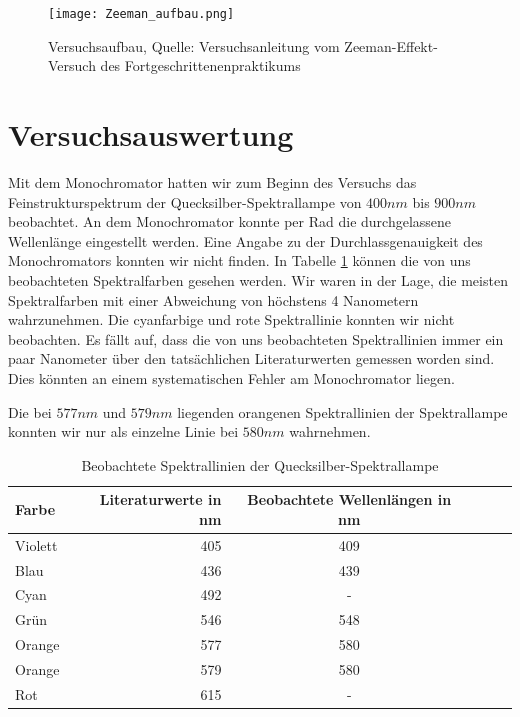 \documentclass[10pt,a4paper]{article}
\begin{document}
\begin{figure}[h]
	\texttt{[image: Zeeman\_aufbau.png]}
	\centering
	\caption{Versuchsaufbau, Quelle: Versuchsanleitung vom Zeeman-Effekt-Versuch des Fortgeschrittenenpraktikums}
	\label{aufbau}
\end{figure}

\section{Versuchsauswertung}


Mit dem Monochromator hatten wir zum Beginn des Versuchs das Feinstrukturspektrum der Quecksilber-Spektrallampe von $400nm$
bis $900nm$ beobachtet. An dem Monochromator konnte per Rad die durchgelassene Wellenlänge eingestellt werden. Eine Angabe zu der Durchlassgenauigkeit des Monochromators konnten wir nicht finden. In Tabelle \ref{spektrum} können die von uns beobachteten Spektralfarben gesehen werden. Wir waren in der Lage, die meisten Spektralfarben mit einer Abweichung von höchstens 4 Nanometern wahrzunehmen. Die cyanfarbige und rote Spektrallinie konnten wir nicht beobachten. Es fällt auf, dass die von uns beobachteten Spektrallinien immer ein paar Nanometer über den tatsächlichen Literaturwerten gemessen worden sind. Dies könnten an einem systematischen Fehler am Monochromator liegen.

Die bei $577nm$ und $579nm$ liegenden orangenen Spektrallinien der Spektrallampe konnten wir nur als einzelne Linie bei $580nm$ wahrnehmen.



\begin{table}[h!]
	\centering
\begin{tabular}{|l|r|c|lrp{16cm}}\hline
	Farbe & Literaturwerte in nm & Beobachtete Wellenlängen in nm\\\hline
	Violett & 405 & 409\\
	Blau & 436 & 439\\
	Cyan & 492 & -\\
	Grün & 546 & 548\\
	Orange & 577 & 580\\
	Orange & 579 & 580\\
	Rot & 615 & -\\\hline
\end{tabular}
	\caption{Beobachtete Spektrallinien der Quecksilber-Spektrallampe}
	\label{spektrum}
	
	
\end{table}\\\\
\\
\\
\end{document}
